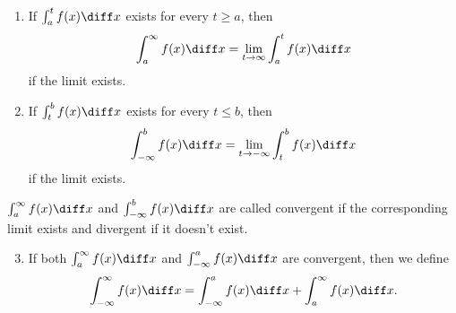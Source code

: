 \begin{frame}
\begin{definition}
\begin{enumerate}
\item  If $\int_a^t f(x) \diff x$ exists for every $t \geq a$, then
\abovedisplayskip=0pt
\belowdisplayskip=0pt
\[
\int_a^\infty f(x) \diff x = \lim_{t\rightarrow \infty} \int_a^t f(x) \diff x
\]
if the limit exists.
\item  If $\int_t^b f(x) \diff x$ exists for every $t \leq b$, then
\abovedisplayskip=0pt
\belowdisplayskip=0pt
\[
\int_{-\infty}^b f(x) \diff x = \lim_{t\rightarrow -\infty} \int_t^b f(x) \diff x
\]
if the limit exists.
\end{enumerate}
$\int_a^\infty f(x) \diff x$ and $\int_{-\infty}^b f(x) \diff x$ are called convergent if the corresponding limit exists and divergent if it doesn't exist.
\begin{enumerate}
\setcounter{enumi}{2}
\item  If both $\int_a^\infty f(x) \diff x$ and $\int_{-\infty}^a f(x) \diff x$ are convergent, then we define
\abovedisplayskip=0pt
\belowdisplayskip=0pt
\[
\int_{-\infty}^\infty f(x) \diff x = \int_{-\infty}^a f(x) \diff x + \int_a^\infty f(x) \diff x .
\]
\end{enumerate}
\end{definition}
\end{frame}
